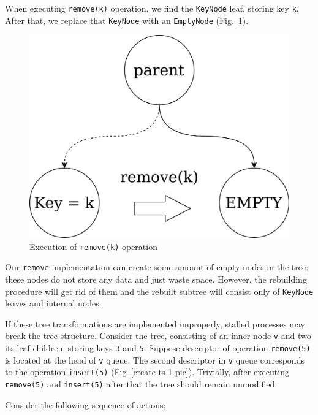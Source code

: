 \documentclass[times, dvipsnames,%
               languages={russian,english} %
              ]{itmo-student-thesis}
\begin{document}
When executing \texttt{remove(k)} operation, we find the \texttt{KeyNode} leaf, storing key \texttt{k}. After that, we replace that \texttt{KeyNode} with an \texttt{EmptyNode} (Fig.~\ref{remove-key-pic}).

\begin{figure}[H]
  \centering
  \caption{Execution of \texttt{remove(k)} operation}
  \label{remove-key-pic}
  \includegraphics[width=0.7\linewidth]{pics/remove-key.png}
\end{figure}

Our \texttt{remove} implementation can create some amount of empty nodes in the tree: these nodes do not store any data and just waste space. However, the rebuilding procedure will get rid of them and the rebuilt subtree will consist only of \texttt{KeyNode} leaves and internal nodes.

If these tree transformations are implemented improperly, stalled processes may break the tree structure. Consider the tree, consisting of an inner node \texttt{v} and two its leaf children, storing keys \texttt{3} and \texttt{5}. Suppose descriptor of operation \texttt{remove(5)} is located at the head of \texttt{v} queue. The second descriptor in \texttt{v} queue corresponds to the operation \texttt{insert(5)} (Fig~\ref{create-ts-1-pic}). Trivially, after executing \texttt{remove(5)} and \texttt{insert(5)} after that the tree should remain unmodified.

Consider the following sequence of actions: 
\end{document}
